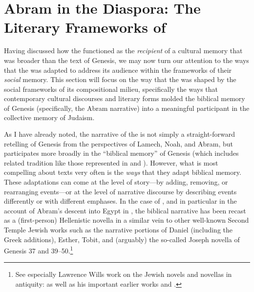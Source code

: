 
\section{Abram in the Diaspora: The Literary Frameworks of \GA}

Having discussed how the \ga functioned as the \emph{recipient} of a cultural memory that was broader than the text of Genesis, we may now turn our attention to the ways that the \ga was adapted to address its audience within the frameworks of their \emph{social} memory. This section will focus on the way that the \ga was shaped by the social frameworks of its compositional milieu, specifically the ways that contemporary cultural discourses and literary forms molded the biblical memory of Genesis (specifically, the Abram narrative) into a meaningful participant in the collective memory of \secondtemple Judaism.

As I have already noted, the narrative of the \ga is not simply a straight-forward retelling of Genesis from the perspectives of Lamech, Noah, and Abram, but participates more broadly in the ``biblical memory'' of Genesis (which includes related tradition like those represented in \firstenoch and \jub). However, what is most compelling about \rwb texts very often is the \emph{ways} that they adapt biblical memory. These adaptations can come at the level of story---by adding, removing, or rearranging events---or at the level of narrative discourse by describing events differently or with different emphases. In the case of \ga, and in particular in the account of Abram's descent into Egypt in , the biblical narrative has been recast as a (first-person) Hellenistic novella in a similar vein to other well-known Second Temple Jewish works such as the narrative portions of Daniel (including the Greek additions), Esther, Tobit, and (arguably) the so-called Joseph novella of Genesis 37 and 39--50.\footnote{See especially Lawrence Wills work on the Jewish novels and novellas in antiquity: \cite*{wills2002} as well as his important earlier works \cite*{wills1995} and \cite{wills1990}.}


\clearpage

% 



